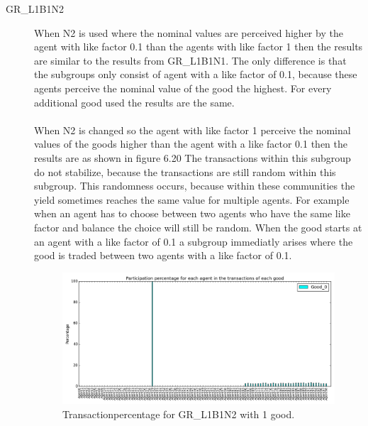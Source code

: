 \documentclass[twoside,openright]{uva-bachelor-thesis}
\begin{document}
\begin{description}
\clearpage
\item[GR\_L1B1N2] When N2 is used where the nominal values are perceived higher by the agent with like factor 0.1 than the agents with like factor 1 then the results are similar to the results from GR\_L1B1N1. The only difference is that the subgroups only consist of agent with a like factor of 0.1, because these agents perceive the nominal value of the good the highest. For every additional good used the results are the same.
\\
\\
When N2 is changed so the agent with like factor 1 perceive the nominal values of the goods higher than the agent with a like factor 0.1 then the results are as shown in figure 6.20  The transactions within this subgroup do not stabilize, because the transactions are still random within this subgroup. This randomness occurs, because within these communities the yield sometimes reaches the same value for multiple agents. For example when an agent has to choose between two agents who have the same like factor and balance the choice will still be random.
When the good starts at an agent with a like factor of 0.1 a subgroup immediatly arises where the good is traded between two agents with a like factor of 0.1.\\
\begin{figure}[h!]
  \centering
\includegraphics[scale=0.4]{Simulation_figures/GR_L1B1N2/321_1good} 
  \caption{Transactionpercentage for GR\_L1B1N2 with 1 good.}
\end{figure}



\end{description}
\end{document}
